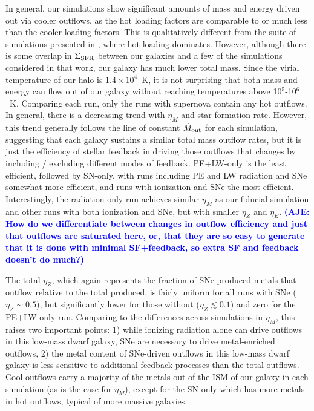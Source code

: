 \documentclass[twocolumn]{aastex62}
\newcommand{\aje}[1]{\textcolor{blue}{\textbf{(AJE: #1)}}}
\begin{document}
In general, our simulations show significant amounts of mass and energy driven out via cooler outflows, as the hot loading factors are comparable to or much less than the cooler loading factors. This is qualitatively different from the suite of simulations presented in \cite{LiBryan2020}, where hot loading dominates. However, although there is some overlap in $\Sigma_{\rm SFR}$ between our galaxies and a few of the simulations considered in that work, our galaxy has much lower total mass. Since the virial temperature of our halo is $1.4 \times 10^4$~K, it is not surprising that both mass and energy can flow out of our galaxy without reaching temperatures above 10$^5$-10$^6$~K. Comparing each run, only the runs with supernova contain any hot outflows. In general, there is a decreasing trend with $\eta_M$ and star formation rate. However, this trend generally follows the line of constant $\dot{M}_{\rm out}$ for each simulation, suggesting that each galaxy sustains a similar total mass outflow rates, but it is just the efficiency of stellar feedback in driving those outflows that changes by including / excluding different modes of feedback. PE+LW-only is the least efficient, followed by SN-only, with runs including PE and LW radiation and SNe somewhat more efficient, and runs with ionization and SNe the most efficient. Interestingly, the radiation-only run achieves similar $\eta_M$ as our fiducial simulation and other runs with both ionization and SNe, but with smaller $\eta_Z$ and $\eta_E$. \aje{How do we differentiate between changes in outflow efficiency and just that outflows are saturated here, or, that they are so easy to generate that it is done with minimal SF+feedback, so extra SF and feedback doesn't do much?}

The total $\eta_Z$, which again represents the fraction of SNe-produced metals that outflow relative to the total produced, is fairly uniform for all runs with SNe ($\eta_Z \sim 0.5$), but significantly lower for those without ($\eta_Z \lesssim 0.1$) and zero for the PE+LW-only run. Comparing to the differences across simulations in $\eta_M$, this raises two important points: 1) while ionizing radiation alone can drive outflows in this low-mass dwarf galaxy, SNe are necessary to drive metal-enriched outflows, 2) the metal content of SNe-driven outflows in this low-mass dwarf galaxy is less sensitive to additional feedback processes than the total outflows. Cool outflows carry a majority of the metals out of the ISM of our galaxy in each simulation (as is the case for $\eta_M$), except for the SN-only which has more metals in hot outflows, typical of more massive galaxies. 
\end{document}
